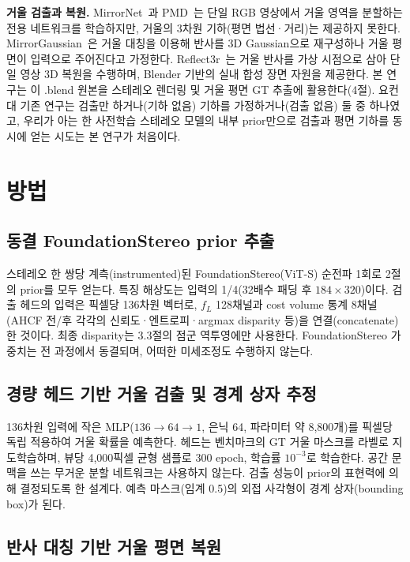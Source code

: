 \documentclass[twocolumn,10pt,a4paper]{article}
\begin{document}
\textbf{거울 검출과 복원.} MirrorNet~\cite{yang2019mirrornet}과 PMD~\cite{lin2020pmd}는 단일 RGB 영상에서 거울 영역을 분할하는 전용 네트워크를 학습하지만, 거울의 3차원 기하(평면 법선·거리)는 제공하지 못한다. MirrorGaussian~\cite{liu2024mirrorgaussian}은 거울 대칭을 이용해 반사를 3D Gaussian으로 재구성하나 거울 평면이 입력으로 주어진다고 가정한다. Reflect3r~\cite{wu2026reflect3r}는 거울 반사를 가상 시점으로 삼아 단일 영상 3D 복원을 수행하며, Blender 기반의 실내 합성 장면 자원을 제공한다. 본 연구는 이 .blend 원본을 스테레오 렌더링 및 거울 평면 GT 추출에 활용한다(4절). 요컨대 기존 연구는 검출만 하거나(기하 없음) 기하를 가정하거나(검출 없음) 둘 중 하나였고, 우리가 아는 한 사전학습 스테레오 모델의 내부 prior만으로 검출과 평면 기하를 동시에 얻는 시도는 본 연구가 처음이다.

\section{방법}

\subsection{동결 FoundationStereo prior 추출}

스테레오 한 쌍당 계측(instrumented)된 FoundationStereo(ViT-S) 순전파 1회로 2절의 prior를 모두 얻는다. 특징 해상도는 입력의 1/4(32배수 패딩 후 $184\times320$)이다. 검출 헤드의 입력은 픽셀당 136차원 벡터로, $f_L$ 128채널과 cost volume 통계 8채널(AHCF 전/후 각각의 신뢰도·엔트로피·argmax disparity 등)을 연결(concatenate)한 것이다. 최종 disparity는 3.3절의 점군 역투영에만 사용한다. FoundationStereo 가중치는 전 과정에서 동결되며, 어떠한 미세조정도 수행하지 않는다.

\subsection{경량 헤드 기반 거울 검출 및 경계 상자 추정}

136차원 입력에 작은 MLP($136{\to}64{\to}1$, 은닉 64, 파라미터 약 8,800개)를 픽셀당 독립 적용하여 거울 확률을 예측한다. 헤드는 벤치마크의 GT 거울 마스크를 라벨로 지도학습하며, 뷰당 4,000픽셀 균형 샘플로 300 epoch, 학습률 $10^{-3}$로 학습한다. 공간 문맥을 쓰는 무거운 분할 네트워크는 사용하지 않는다. 검출 성능이 prior의 표현력에 의해 결정되도록 한 설계다. 예측 마스크(임계 0.5)의 외접 사각형이 경계 상자(bounding box)가 된다.

\subsection{반사 대칭 기반 거울 평면 복원}
\end{document}
